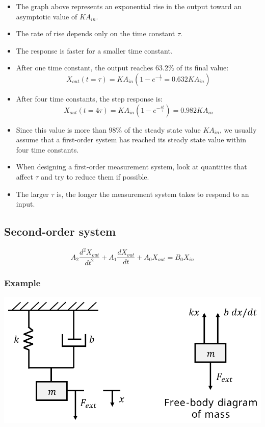 \documentclass[11pt]{article}
\begin{document}
\begin{itemize}
\item The graph above represents an exponential rise in the output toward an asymptotic value of \(KA_{in}\).
\item The rate of rise depends only on the time constant \(\tau\).
\item The response is faster for a smaller time constant.
\item After one time constant, the output reaches 63.2\% of its final value:
\[X_{out} (t = \tau) = KA_{in} (1 - e^{- \frac{t}{\tau}} = 0.632 KA_{in})\]
\item After four time constants, the step response is:
\[X_{out} (t = 4 \tau) = KA_{in} (1 - e^{- \frac{4t}{\tau}}) = 0.982 KA_{in}\]
\item Since this value is more than 98\% of the steady state value \(KA_{in}\), we usually assume that a first-order system has reached its steady state value within four time constants.
\item When designing a first-order measurement system, look at quantities that affect \(\tau\) and try to reduce them if possible.
\item The larger \(\tau\) is, the longer the measurement system takes to respond to an input.
\end{itemize}
\subsection{Second-order system}
\label{sec:org5a33388}
\[A_2 \frac{d^2 X_{out}}{dt^2} + A_1 \frac{dX_{out}}{dt} + A_0 X_{out} = B_0 X_{in}\]
\subsubsection{Example}
\label{sec:org4378f76}
\begin{center}
\includegraphics[width=.9\linewidth]{./images/spring-damping-system.png}
\end{center}
\end{document}
